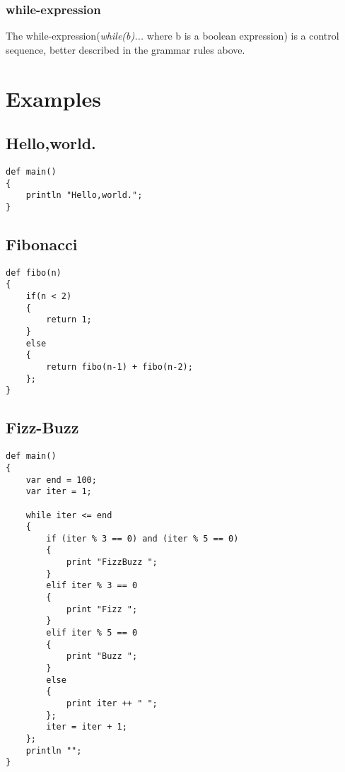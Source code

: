 \documentclass[12pt]{article}
\begin{document}
\subsubsection{while-expression}
The while-expression(\emph{while(b)...} where b is a boolean expression) is a control sequence, better described in the grammar rules above.



\section{Examples}

\subsection{Hello,world.}
\begin{framed}
\begin{verbatim}
def main()
{
	println "Hello,world.";
}
\end{verbatim}
\end{framed}

\subsection{Fibonacci}
\begin{framed}
\begin{verbatim}
def fibo(n)
{
	if(n < 2)
	{
		return 1;
	}
	else
	{
		return fibo(n-1) + fibo(n-2);
	};
}
\end{verbatim}
\end{framed}


\subsection{Fizz-Buzz}
\begin{framed}
\begin{verbatim}
def main()
{
	var end = 100;
	var iter = 1;

	while iter <= end
	{
		if (iter % 3 == 0) and (iter % 5 == 0)
		{
			print "FizzBuzz ";
		}
		elif iter % 3 == 0
		{
			print "Fizz ";
		}
		elif iter % 5 == 0
		{
			print "Buzz ";
		}
		else
		{
			print iter ++ " ";
		};
		iter = iter + 1;
	};
	println "";
}
\end{verbatim}
\end{framed}
\end{document}
